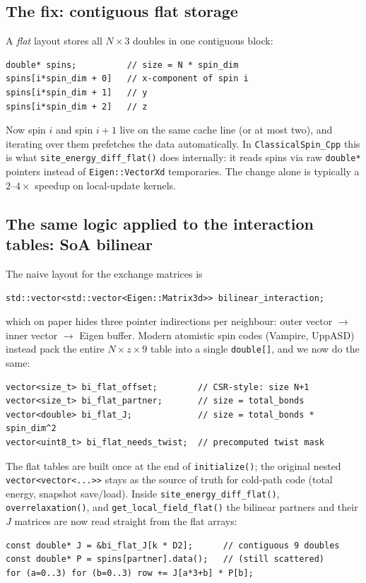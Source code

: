 \documentclass[11pt,letterpaper]{article}
\begin{document}
\subsection{The fix: contiguous flat storage}
A \emph{flat} layout stores all $N \times 3$ doubles in one contiguous
block:
\begin{lstlisting}
double* spins;          // size = N * spin_dim
spins[i*spin_dim + 0]   // x-component of spin i
spins[i*spin_dim + 1]   // y
spins[i*spin_dim + 2]   // z
\end{lstlisting}
Now spin $i$ and spin $i{+}1$ live on the same cache line (or at most
two), and iterating over them prefetches the data automatically.  In
\texttt{ClassicalSpin\_Cpp} this is what \texttt{site\_energy\_diff\_flat()}
does internally: it reads spins via raw \texttt{double*} pointers
instead of \texttt{Eigen::VectorXd} temporaries.  The change alone is
typically a $2$--$4 \times$ speedup on local-update kernels.

\subsection{The same logic applied to the interaction tables: SoA bilinear}
\label{sec:soa}
The naive layout for the exchange matrices is
\begin{lstlisting}
std::vector<std::vector<Eigen::Matrix3d>> bilinear_interaction;
\end{lstlisting}
which on paper hides three pointer indirections per neighbour: outer
vector $\to$ inner vector $\to$ Eigen buffer.  Modern atomistic spin
codes (Vampire, UppASD) instead pack the entire $N \times z \times 9$
table into a single \texttt{double[]}, and we now do the same:
\begin{lstlisting}
vector<size_t> bi_flat_offset;        // CSR-style: size N+1
vector<size_t> bi_flat_partner;       // size = total_bonds
vector<double> bi_flat_J;             // size = total_bonds * spin_dim^2
vector<uint8_t> bi_flat_needs_twist;  // precomputed twist mask
\end{lstlisting}
The flat tables are built once at the end of \texttt{initialize()};
the original nested \texttt{vector<vector<...>>} stays as the source
of truth for cold-path code (total energy, snapshot save/load).
Inside \texttt{site\_energy\_diff\_flat()}, \texttt{overrelaxation()},
and \texttt{get\_local\_field\_flat()} the bilinear partners and their
$J$ matrices are now read straight from the flat arrays:

\begin{lstlisting}
const double* J = &bi_flat_J[k * D2];      // contiguous 9 doubles
const double* P = spins[partner].data();   // (still scattered)
for (a=0..3) for (b=0..3) row += J[a*3+b] * P[b];
\end{lstlisting}
\end{document}
